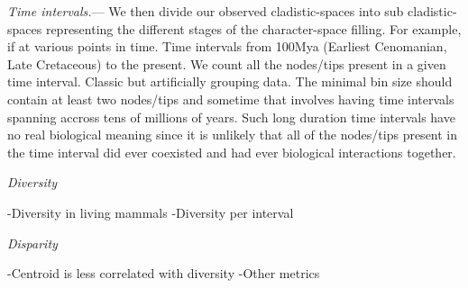 \documentclass[12pt,letterpaper]{article}
\renewcommand{\subsection}[1]{%
\bigskip
\begin{center}
\begin{large}
\normalfont\itshape #1
\end{large}
\end{center}}
\renewcommand{\subsubsection}[1]{%
\vspace{2ex}
\noindent
\textit{#1.}---}
\begin{document}
\subsubsection{Time intervals}
We then divide our observed cladistic-spaces into sub cladistic-spaces representing the different stages of the character-space filling. For example, if at various points in time.
Time intervals from 100Mya (Earliest Cenomanian, Late Cretaceous) to the present.
We count all the nodes/tips present in a given time interval.
Classic but artificially grouping data. The minimal bin size should contain at least two nodes/tips and sometime that involves having time intervals spanning accross tens of millions of years. Such long duration time intervals have no real biological meaning since it is unlikely that all of the nodes/tips present in the time interval did ever coexisted and had ever biological interactions together.

\subsection{Diversity}
-Diversity in living mammals
-Diversity per interval

\subsection{Disparity}
-Centroid is less correlated with diversity
-Other metrics
\end{document}
